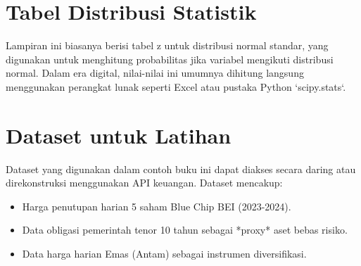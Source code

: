 \documentclass[12pt,a4paper]{book}
\begin{document}
\chapter{Tabel Distribusi Statistik}
Lampiran ini biasanya berisi tabel z untuk distribusi normal standar, yang digunakan untuk menghitung probabilitas jika variabel mengikuti distribusi normal. Dalam era digital, nilai-nilai ini umumnya dihitung langsung menggunakan perangkat lunak seperti Excel atau pustaka Python `scipy.stats`.

\chapter{Dataset untuk Latihan}
Dataset yang digunakan dalam contoh buku ini dapat diakses secara daring atau direkonstruksi menggunakan API keuangan. Dataset mencakup:
\begin{itemize}
    \item Harga penutupan harian 5 saham Blue Chip BEI (2023-2024).
    \item Data obligasi pemerintah tenor 10 tahun sebagai *proxy* aset bebas risiko.
    \item Data harga harian Emas (Antam) sebagai instrumen diversifikasi.
\end{itemize}

\backmatter




\printindex
\end{document}
